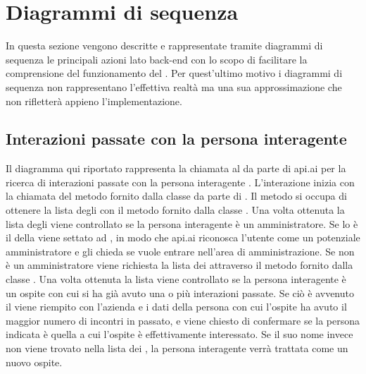 \section{Diagrammi di sequenza}
In questa sezione vengono descritte e rappresentate tramite diagrammi di sequenza  le principali azioni lato back-end con lo scopo di facilitare la comprensione del funzionamento del . Per quest'ultimo motivo i diagrammi di sequenza non rappresentano l'effettiva realtà ma una sua approssimazione che non rifletterà appieno l'implementazione.
\subsection{Interazioni passate con la persona interagente}
Il diagramma qui riportato rappresenta la chiamata al  da parte di api.ai per la ricerca di interazioni passate con la persona interagente . L'interazione inizia con la chiamata del metodo  fornito dalla classe  da parte di . Il metodo si occupa di ottenere la lista degli  con il metodo  fornito dalla classe . Una volta ottenuta la lista degli  viene controllato se la persona interagente è un amministratore. Se lo è il  della  viene settato ad , in modo che api.ai riconosca l'utente come un potenziale amministratore e gli chieda se vuole entrare nell'area di amministrazione. Se non è un amministratore viene richiesta la lista dei  attraverso il metodo  fornito dalla classe . Una volta ottenuta la lista viene controllato se la persona interagente è un ospite con cui si ha già avuto una o più interazioni passate. Se ciò è avvenuto il  viene riempito con l'azienda e i dati della persona con cui l'ospite ha avuto il maggior numero di incontri in passato, e viene chiesto di confermare se la persona indicata è quella a cui l'ospite è effettivamente interessato. Se il suo nome invece non viene trovato nella lista dei , la persona interagente verrà trattata come un nuovo ospite.
